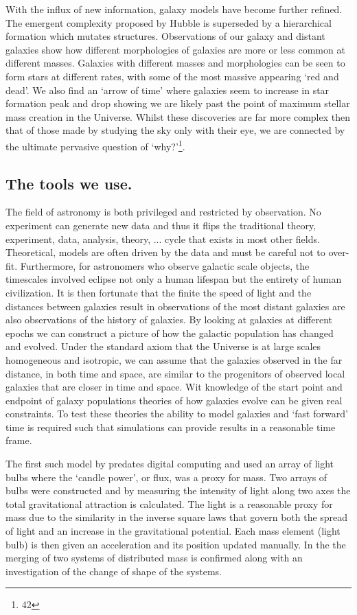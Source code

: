 With the influx of new information, galaxy models have become further refined. The emergent complexity proposed by Hubble is superseded by a hierarchical formation which mutates structures. Observations of our galaxy and distant galaxies show how different morphologies of galaxies are more or less common at different masses. Galaxies with different masses and morphologies can be seen to form stars at different rates, with some of the most massive appearing `red and dead'. We also find an `arrow of time' where galaxies seem to increase in star formation peak and drop showing we are likely past the point of maximum stellar mass creation in the Universe. Whilst these discoveries are far more complex then that of those made by studying the sky only with their eye, we are connected by the ultimate pervasive question of `why?'\footnote{42}.

\subsection{The tools we use.}
The field of astronomy is both privileged and restricted by observation. No experiment can generate new data and thus it flips the traditional theory, experiment, data, analysis, theory, ... cycle that exists in most other fields. Theoretical, models are often driven by the data and must be careful not to over-fit. Furthermore, for astronomers who observe galactic scale objects, the timescales involved eclipse not only a human lifespan but the entirety of human civilization. It is then fortunate that the finite the speed of light and the distances between galaxies result in observations of the most distant galaxies are also observations of the history of galaxies. By looking at galaxies at different epochs we can construct a picture of how the galactic population has changed and evolved. Under the standard axiom that the Universe is at large scales homogeneous and isotropic, we can assume that the galaxies observed in the far distance, in both time and space, are similar to the progenitors of observed local galaxies that are closer in time and space. Wit knowledge of the start point and endpoint of galaxy populations theories of how galaxies evolve can be given real constraints. To test these theories the ability to model galaxies and `fast forward' time is required such that simulations can provide results in a reasonable time frame.

The first such model by \citet{Holmberg1941OnProcedure.} predates digital computing and used an array of light bulbs where the `candle power', or flux, was a proxy for mass. Two arrays of bulbs were constructed and by measuring the intensity of light along two axes the total gravitational attraction is calculated. The light is a reasonable proxy for mass due to the similarity in the inverse square laws that govern both the spread of light and an increase in the gravitational potential. Each mass element (light bulb) is then given an acceleration and its position updated manually. In the \citet{Holmberg1941OnProcedure.} the merging of two systems of distributed mass is confirmed along with an investigation of the change of shape of the systems. 

